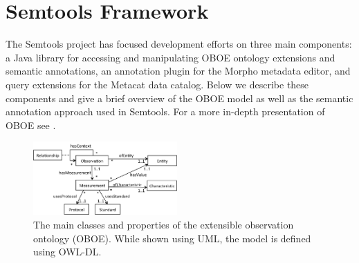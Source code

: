 
\section{Semtools Framework}
\label{sec:framework}

The Semtools project has focused development efforts on three main
components: a Java library for accessing and manipulating OBOE
ontology extensions and semantic annotations, an annotation plugin for
the Morpho metadata editor, and query extensions for the Metacat data
catalog. Below we describe these components and give a brief
overview of the OBOE model as well as the semantic annotation approach
used in Semtools. For a more in-depth presentation of OBOE see
\cite{madin07:_ontol_for_descr_and_synth,bowers08}.

\begin{figure}[!t]
  \centering
  \includegraphics[width=0.49\textwidth]{images/oboe}
  \caption{The main classes and properties of the extensible
    observation ontology (OBOE). While shown using UML, the model is
    defined using OWL-DL.}
  \label{fig:oboe}
\end{figure}

